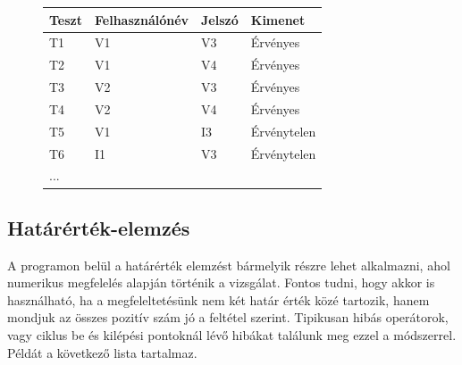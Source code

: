 \begin{figure} [h]
	\begin{center}
		\begin{tabular}{| p{3cm} | p{3cm} | p{3cm} | p{3cm} |}
			\hline
			Teszt & Felhasználónév & Jelszó & Kimenet \\
			\hline
			T1 & V1 & V3 & Érvényes \\
			\hline
			T2 & V1 & V4 & Érvényes \\
			\hline
			T3 & V2 & V3 & Érvényes \\
			\hline
			T4 & V2 & V4 & Érvényes \\
			\hline
			T5 & V1 & I3 & Érvénytelen \\
			\hline
			T6 & I1 & V3 & Érvénytelen \\
			\hline
			... & & & \\
			\hline
			\end{tabular}
	\end{center}
\end{figure}

\subsection{Határérték-elemzés} A programon belül a határérték elemzést bármelyik részre lehet alkalmazni, ahol numerikus megfelelés alapján történik a vizsgálat. Fontos tudni, hogy akkor is használható, ha a megfeleltetésünk nem két határ érték közé tartozik, hanem mondjuk az összes pozitív szám jó a feltétel szerint. Tipikusan hibás operátorok, vagy ciklus be és kilépési pontoknál lévő hibákat találunk meg ezzel a módszerrel. Példát a következő lista tartalmaz.

